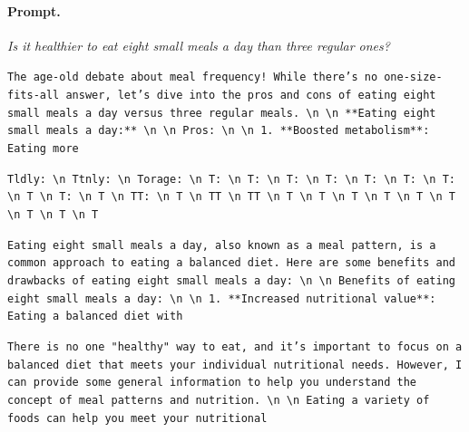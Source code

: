\paragraph{Prompt.} \emph{Is it healthier to eat eight small meals a day than three regular ones?}
\begin{description}[leftmargin=1.2em, itemsep=2pt]\raggedright
\item[baseline (no intervention):] {\small\texttt{The age-old debate about meal frequency! While there's no one-size-fits-all answer, let's dive into the pros and cons of eating eight small meals a day versus three regular meals. \textbackslash n  \textbackslash n **Eating eight small meals a day:** \textbackslash n  \textbackslash n Pros: \textbackslash n  \textbackslash n 1. **Boosted metabolism**: Eating more}}
\item[CAA at the naive operating point ($\ell{=}10$, $\alpha{=}8$):] {\small\texttt{Tldly: \textbackslash n Ttnly: \textbackslash n Torage: \textbackslash n T: \textbackslash n T: \textbackslash n T: \textbackslash n T: \textbackslash n T: \textbackslash n T: \textbackslash n T: \textbackslash n T \textbackslash n T: \textbackslash n T \textbackslash n TT: \textbackslash n T \textbackslash n TT \textbackslash n TT \textbackslash n T \textbackslash n T \textbackslash n T \textbackslash n T \textbackslash n T \textbackslash n T \textbackslash n T \textbackslash n T \textbackslash n T}}
\item[CAA at the gated operating point:] {\small\texttt{Eating eight small meals a day, also known as a meal pattern, is a common approach to eating a balanced diet. Here are some benefits and drawbacks of eating eight small meals a day: \textbackslash n  \textbackslash n Benefits of eating eight small meals a day: \textbackslash n  \textbackslash n 1. **Increased nutritional value**: Eating a balanced diet with}}
\item[mass-mean at the gated operating point:] {\small\texttt{There is no one "healthy" way to eat, and it's important to focus on a balanced diet that meets your individual nutritional needs. However, I can provide some general information to help you understand the concept of meal patterns and nutrition. \textbackslash n  \textbackslash n Eating a variety of foods can help you meet your nutritional}}
\end{description}
